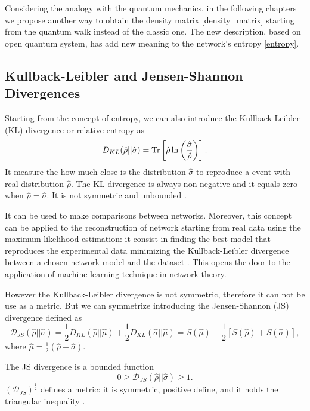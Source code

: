 Considering the analogy with the quantum mechanics, in the following chapters we propose another way to obtain the density matrix \eqref{density_matrix} starting from the quantum walk instead of the classic one. The new description, based on open quantum system, has add new meaning to the network's entropy \eqref{entropy}.

\subsection{Kullback-Leibler and Jensen-Shannon Divergences}
Starting from the concept of entropy, we can also introduce the Kullback-Leibler (KL) divergence or relative entropy \cite{K-L_divergence} as
\begin{equation}\label{KL_divergence}
    D_{KL}(\hat \rho || \hat \sigma) = \operatorname{Tr} \left[\hat \rho \ln\left(\frac{\hat\sigma}{\hat\rho}\right)\right].
\end{equation}
It measure the how much close is the distribution $\hat \sigma$ to reproduce a event with real distribution $\hat \rho$. 
The KL divergence is always non negative and it equals zero when $\hat \rho = \hat \sigma$. It is not symmetric and unbounded \cite{J-S_divergence}.

It can be used to make comparisons between networks. Moreover, this concept can be applied to the reconstruction of network starting from real data using the maximum likelihood estimation: it consist in finding the best model that reproduces the experimental data minimizing the Kullback-Leibler divergence between a chosen network model and the dataset \cite{De_Domenico_2016}. This opens the door to the application of machine learning technique in network theory.

However the Kullback-Leibler divergence is not symmetric, therefore it can not be use as a metric. 
But we can symmetrize introducing the Jensen-Shannon (JS) divergence \cite{J-S_divergence} defined as
\begin{equation}\label{JS_metric}
    \mathcal{D}_{JS}(\hat\rho||\hat\sigma) =  \frac{1}{2}D_{KL}(\hat \rho || \hat \mu) + \frac{1}{2}D_{KL}(\hat \sigma || \hat \mu) = S(\hat\mu)-\frac{1}{2}\left[S(\hat\rho) + S(\hat\sigma)\right],
\end{equation}
where $\hat\mu =\frac{1}{2}(\hat\rho+\hat\sigma)$. 

The JS divergence is a bounded function \cite{J-S_divergence}
\begin{equation}
    0 \geq \mathcal{D}_{JS}(\hat\rho||\hat\sigma) \geq 1.
\end{equation}
$\left(\mathcal{D}_{JS}\right)^{\frac{1}{2}}$ defines a metric: it is symmetric, positive define, and it holds the triangular inequality \cite{Jensen-Shannon_divergence}. 

